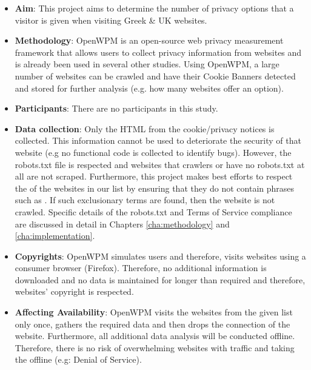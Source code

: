 \documentclass[../main.tex]{subfiles}
\begin{document}
\begin{itemize}
    \setlength\itemsep{1em}

    \item \textbf{Aim}: This project aims to determine the number of privacy options that a visitor is given when visiting Greek \& UK websites. 

    \item \textbf{Methodology}: OpenWPM is an open-source web privacy measurement framework that allows users to collect privacy information from websites and is already been used in several other studies. Using OpenWPM, a large number of websites can be crawled and have their Cookie Banners detected and stored for further analysis (e.g. how many websites offer an  option).

    \item \textbf{Participants}: There are no participants in this study.

    \item \textbf{Data collection}: Only the HTML from the cookie/privacy notices is collected. This information cannot be used to deteriorate the security of that website (e.g no functional code is collected to identify bugs). However, the robots.txt file is respected and websites that  crawlers or have no robots.txt at all are not scraped. Furthermore, this project makes best efforts to respect the  of the websites in our list by ensuring that they do not contain phrases such as . If such exclusionary terms are found, then the website is not crawled. Specific details of the robots.txt and Terms of Service compliance are discussed in detail in Chapters \ref{cha:methodology} and \ref{cha:implementation}.

    \item \textbf{Copyrights}: OpenWPM simulates  users and therefore, visits websites using a consumer browser (Firefox). Therefore, no additional information is downloaded and no data is maintained for longer than required and therefore, websites' copyright is respected.

    \item \textbf{Affecting Availability}: OpenWPM visits the websites from the given list only once, gathers the required data and then drops the connection of the website. Furthermore, all additional data analysis will be conducted offline. Therefore, there is no risk of overwhelming websites with traffic and taking the offline (e.g: Denial of Service).
\end{itemize}
\end{document}
